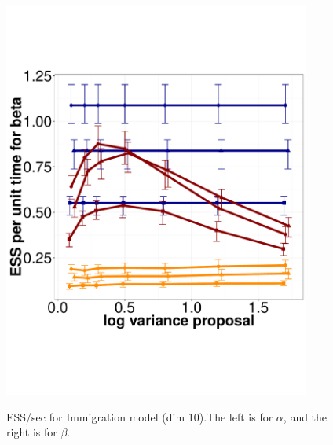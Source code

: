 \begin{figure}
\begin{minipage}[hp]{0.45\linewidth}
    \includegraphics [width=0.90\textwidth, angle=0]{figs/q_10_beta.pdf}
    \vspace{-0 in}
     \label{fig:ESS_Q_D10}
  \end{minipage}
    \caption{ESS/sec for Immigration model (dim 10).The left is for $\alpha$, and the right is for $\beta$.}
  \end{figure}




